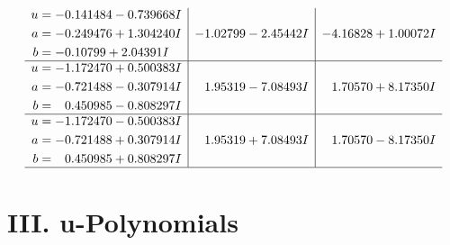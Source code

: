 \documentclass[1p]{elsarticle_modified}
\theoremstyle{definition}
\begin{document}
$$\begin{array}{c|c|c}
\begin{aligned}
u &= -0.141484 - 0.739668 I \\
a &= -0.249476 + 1.304240 I \\
b &= -0.10799 + 2.04391 I\end{aligned}
 & -1.02799 - 2.45442 I & -4.16828 + 1.00072 I \\ \hline\begin{aligned}
u &= -1.172470 + 0.500383 I \\
a &= -0.721488 - 0.307914 I \\
b &= \phantom{-}0.450985 - 0.808297 I\end{aligned}
 & \phantom{-}1.95319 - 7.08493 I & \phantom{-}1.70570 + 8.17350 I \\ \hline\begin{aligned}
u &= -1.172470 - 0.500383 I \\
a &= -0.721488 + 0.307914 I \\
b &= \phantom{-}0.450985 + 0.808297 I\end{aligned}
 & \phantom{-}1.95319 + 7.08493 I & \phantom{-}1.70570 - 8.17350 I\\
 \hline 
 \end{array}$$\newpage
\newpage\renewcommand{\arraystretch}{1}
\centering \section*{ III. u-Polynomials}
\end{document}
